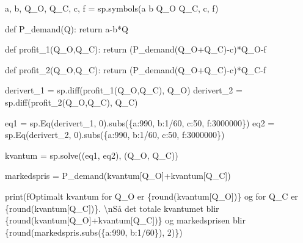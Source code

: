 \documentclass[
  12pt,
  a4paper,
  DIV=11,
  numbers=noendperiod]{scrartcl}
\newenvironment{Shaded}{\begin{snugshade}}{\end{snugshade}}
\newcommand{\BuiltInTok}[1]{\textcolor[rgb]{0.00,0.23,0.31}{#1}}
\newcommand{\CharTok}[1]{\textcolor[rgb]{0.13,0.47,0.30}{#1}}
\newcommand{\ControlFlowTok}[1]{\textcolor[rgb]{0.00,0.23,0.31}{#1}}
\newcommand{\DecValTok}[1]{\textcolor[rgb]{0.68,0.00,0.00}{#1}}
\newcommand{\KeywordTok}[1]{\textcolor[rgb]{0.00,0.23,0.31}{#1}}
\newcommand{\NormalTok}[1]{\textcolor[rgb]{0.00,0.23,0.31}{#1}}
\newcommand{\OperatorTok}[1]{\textcolor[rgb]{0.37,0.37,0.37}{#1}}
\newcommand{\SpecialCharTok}[1]{\textcolor[rgb]{0.37,0.37,0.37}{#1}}
\newcommand{\SpecialStringTok}[1]{\textcolor[rgb]{0.13,0.47,0.30}{#1}}
\newcommand{\StringTok}[1]{\textcolor[rgb]{0.13,0.47,0.30}{#1}}
\begin{document}
\begin{Shaded}
\begin{Highlighting}[]
\NormalTok{a, b, Q\_O, Q\_C, c, f }\OperatorTok{=}\NormalTok{ sp.symbols(}\StringTok{\textquotesingle{}a b Q\_O Q\_C, c, f\textquotesingle{}}\NormalTok{)}

\KeywordTok{def}\NormalTok{ P\_demand(Q):}
    \ControlFlowTok{return}\NormalTok{ a}\OperatorTok{{-}}\NormalTok{b}\OperatorTok{*}\NormalTok{Q}


\KeywordTok{def}\NormalTok{ profit\_1(Q\_O,Q\_C):}
    \ControlFlowTok{return}\NormalTok{ (P\_demand(Q\_O}\OperatorTok{+}\NormalTok{Q\_C)}\OperatorTok{{-}}\NormalTok{c)}\OperatorTok{*}\NormalTok{Q\_O}\OperatorTok{{-}}\NormalTok{f}

\KeywordTok{def}\NormalTok{ profit\_2(Q\_O,Q\_C):}
    \ControlFlowTok{return}\NormalTok{ (P\_demand(Q\_O}\OperatorTok{+}\NormalTok{Q\_C)}\OperatorTok{{-}}\NormalTok{c)}\OperatorTok{*}\NormalTok{Q\_C}\OperatorTok{{-}}\NormalTok{f}

\NormalTok{derivert\_1 }\OperatorTok{=}\NormalTok{ sp.diff(profit\_1(Q\_O,Q\_C), Q\_O)}
\NormalTok{derivert\_2 }\OperatorTok{=}\NormalTok{ sp.diff(profit\_2(Q\_O,Q\_C), Q\_C)}

\NormalTok{eq1 }\OperatorTok{=}\NormalTok{ sp.Eq(derivert\_1, }\DecValTok{0}\NormalTok{).subs(\{a:}\DecValTok{990}\NormalTok{, b:}\DecValTok{1}\OperatorTok{/}\DecValTok{60}\NormalTok{, c:}\DecValTok{50}\NormalTok{, f:}\DecValTok{3000000}\NormalTok{\})}
\NormalTok{eq2 }\OperatorTok{=}\NormalTok{ sp.Eq(derivert\_2, }\DecValTok{0}\NormalTok{).subs(\{a:}\DecValTok{990}\NormalTok{, b:}\DecValTok{1}\OperatorTok{/}\DecValTok{60}\NormalTok{, c:}\DecValTok{50}\NormalTok{, f:}\DecValTok{3000000}\NormalTok{\})}

\NormalTok{kvantum }\OperatorTok{=}\NormalTok{ sp.solve((eq1, eq2), (Q\_O, Q\_C))}

\NormalTok{markedspris }\OperatorTok{=}\NormalTok{ P\_demand(kvantum[Q\_O]}\OperatorTok{+}\NormalTok{kvantum[Q\_C])}


\BuiltInTok{print}\NormalTok{(}\SpecialStringTok{f\textquotesingle{}\textquotesingle{}\textquotesingle{}Optimalt kvantum for Q\_O er }\SpecialCharTok{\{}\BuiltInTok{round}\NormalTok{(kvantum[Q\_O])}\SpecialCharTok{\}}\SpecialStringTok{ og for Q\_C er }\SpecialCharTok{\{}\BuiltInTok{round}\NormalTok{(kvantum[Q\_C])}\SpecialCharTok{\}}\SpecialStringTok{. }\CharTok{\textbackslash{}n}\SpecialStringTok{Så det totale kvantumet blir }\SpecialCharTok{\{}\BuiltInTok{round}\NormalTok{(kvantum[Q\_O]}\OperatorTok{+}\NormalTok{kvantum[Q\_C])}\SpecialCharTok{\}}\SpecialStringTok{ og markedsprisen blir }\SpecialCharTok{\{}\BuiltInTok{round}\NormalTok{(markedspris.subs(\{a:}\DecValTok{990}\NormalTok{, b:}\DecValTok{1}\OperatorTok{/}\DecValTok{60}\NormalTok{\}), }\DecValTok{2}\NormalTok{)}\SpecialCharTok{\}}\SpecialStringTok{\textquotesingle{}\textquotesingle{}\textquotesingle{}}\NormalTok{)}
\end{Highlighting}
\end{Shaded}
\end{document}
